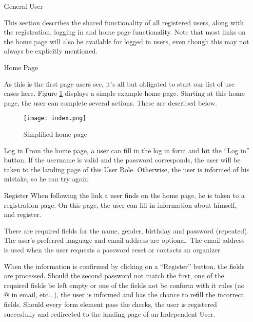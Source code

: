 
\begin{section}{General User}

    This section describes the shared functionality of all registered users,
    along with the registration, logging in and home page functionality. Note
    that most links on the home page will also be available for logged in users,
    even though this may not always be explicitly mentioned.

    \begin{subsection}{Home Page}

        As this is the first page users see, it's all but obligated to start our
        list of use cases here. Figure \ref{img:index} displays a simple example
        home page. Starting at this home page, the user can complete several
        actions. These are described below.

        \begin{figure}[h]
            \centering
            \texttt{[image: index.png]}
            \caption{Simplified home page}
            \label{img:index}
        \end{figure}

        \begin{subsubsection}{Log in}
            From the home page, a user can fill in the log in form and hit the
            ``Log in'' button. If the username is valid and the password
            corresponds, the user will be taken to the landing page of this User
            Role. Otherwise, the user is informed of his mistake, so he can try
            again.
        \end{subsubsection}

        \begin{subsubsection}{Register}
            When following the link a user finds on the home page, he is taken
            to a registration page. On this page, the user can fill in
            information about himself, and register.

            There are required fields for the name, gender, birthday and
            password (repeated). The user's preferred language and
            email address are optional. The email address is used when the user
            requests a password reset or contacts an organizer.

            When the information is confirmed by clicking on a ``Register''
            button, the fields are processed. Should the second password not
            match the first, one of the required fields be left empty or one of
            the fields not be conform with it rules (no @ in email, etc...), the
            user is informed and has the chance to refill the incorrect fields.
            Should every form element pass the checks, the user is registered
            succesfully and redirected to the landing page of an Independent
            User.
        \end{subsubsection}


\end{subsection}
\end{section}
